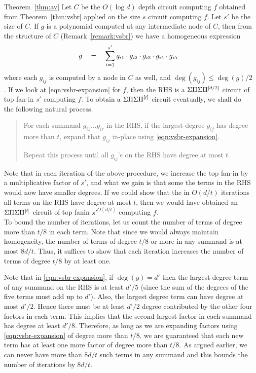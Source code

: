 \begin{proofof}{Theorem~\ref{thm:av}}
Let $C$ be the $O(\log d)$ depth  circuit computing $f$ obtained from Theorem~\ref{thm:vsbr} applied on the size $s$ circuit computing $f$. Let $s'$ be the size of $C$. If $g$ is a polynomial computed at any intermediate node of $C$, then from the structure of $C$ (Remark~\ref{remark:vsbr}) we have a homogeneous expression
\begin{equation}\label{eqn:vsbr-expansion}
g \quad = \quad \sum_{i=1}^{s'} g_{i1} \cdot g_{i2} \cdot g_{i3} \cdot g_{i4} \cdot g_{i5} 
\end{equation}
where each $g_{ij}$ is computed by a node in $C$ as well, and $\deg(g_{ij}) \leq \deg(g)/2$. If we look at \eqref{eqn:vsbr-expansion} for $f$, then the RHS is a $\Sigma\Pi\Sigma\Pi^{[d/2]}$ circuit of top fan-in $s'$ computing $f$. To obtain a $\Sigma\Pi\Sigma\Pi^{[t]}$ circuit eventually, we shall do the following natural process. 
\begin{quote}
  For each summand $g_{i1}\dots g_{ir}$ in the RHS, if the largest degree $g_{ij}$ has degree more than $t$, expand that $g_{ij}$ in-place using \eqref{eqn:vsbr-expansion}. 
  
  Repeat this process until all $g_{ij}$'s on the RHS have degree at most $t$. 
\end{quote}

Note that in each iteration of the above procedure, we increase the top fan-in by a multiplicative factor of $s'$, and what we gain is that some the terms in the RHS would now have smaller degrees. If we could show that the in $O(d/t)$  iterations  all terms on the RHS have degree at most $t$, then we would have obtained an $\Sigma\Pi\Sigma\Pi^{[t]}$ circuit of top fanin $s'^{O(d/t)}$ computing $f$. \\

To bound the number of iterations, let us count the number of terms of degree more than $t/8$ in each term. Note that since we would always maintain homogeneity, the number of terms of degree  $t/8$ or more in any summand  is at most $8d/t$. Thus, it suffices to show that each iteration increases the number of terms of degree $t/8$ by at least one. 

Note that in \eqref{eqn:vsbr-expansion}, if $\deg(g) = d'$ then the largest degree term of any summand on the RHS is at least $d'/5$ (since the sum of the degrees of the five terms must add up to $d'$). Also, the largest degree term can have degree at most $d'/2$. Hence there must be at least $d'/2$ degree contributed by the other four factors in each term. This implies that the second largest factor in each summand has degree at least $d'/8$. Therefore, as long as we are expanding factors using \eqref{eqn:vsbr-expansion} of degree more than $t/8$, we are guaranteed that each new term has at least one more factor of degree more than $t/8$. As argued earlier, we can never have more than $8d/t$ such terms in any summand and this bounds the number of iterations by $8d/t$. 


\end{proofof}
